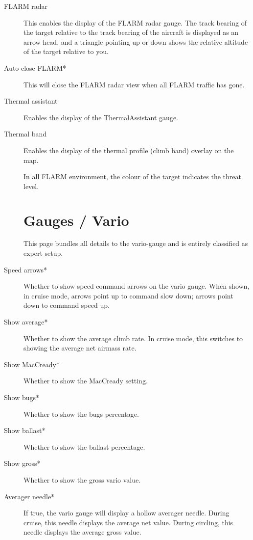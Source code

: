 \begin{description}
\item[FLARM radar]  \label{conf:flarmdisplay} This enables the display of the FLARM 
  radar gauge. The track bearing of the target relative to the track bearing of the 
  aircraft is displayed as an arrow head, and a triangle pointing up or down shows 
  the relative altitude of the target relative to you.
\\
\item[Auto close FLARM*]  This will close the FLARM radar view when all FLARM 
  traffic has gone.
\item[Thermal assistant] \label{conf:thermalassistant} Enables the display of the
  ThermalAssistant gauge.
\item[Thermal band] \label{conf:thermalband} Enables the display of the
  thermal profile (climb band) overlay on the map.

In all FLARM environment, the colour of the target indicates the threat level.


\section{Gauges / Vario}\label{sec:vario-gauge}

This page bundles all details to the vario-gauge and is entirely classified as expert setup.

\item[Speed arrows*]  \label{conf:variogauge} Whether to show speed command 
  arrows on the vario gauge.
  When shown, in cruise mode, arrows point up to command slow down; arrows point down 
  to command speed up.
\item[Show average*]  Whether to show the average climb rate.  In cruise mode, this 
  switches to showing the average net airmass rate.
\item[Show MacCready*]  Whether to show the MacCready setting.
\item[Show bugs*]  Whether to show the bugs percentage.
\item[Show ballast*]  Whether to show the ballast percentage.
\item[Show gross*]  Whether to show the gross vario value.
\item[Averager needle*]  If true, the vario gauge will display a hollow averager
  needle. During cruise, this needle displays the average net value. During circling, 
  this needle displays the average gross value.
\end{description}


